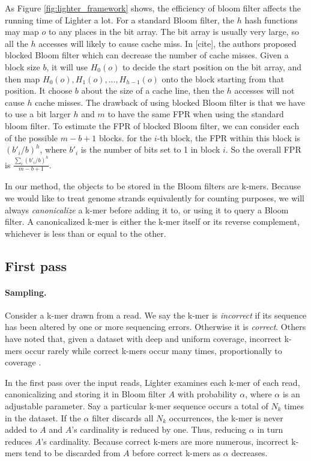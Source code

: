 \documentclass[10pt]{article}
\begin{document}
As Figure \ref{fig:lighter_framework} shows, the efficiency of bloom filter affects the running time of Lighter a lot. For a standard Bloom filter, the $h$ hash functions may map $o$ to any places in the bit array. The bit array is usually very large, so all the $h$ accesses will likely to cause cache miss. In [cite], the authors proposed blocked Bloom filter which can decrease the number of cache misses. Given a block size $b$, it will use $H_0(o)$ to decide the start position on the bit array, and then map $H_0(o), H_1(o),...,H_{h-1}(o)$ onto the block starting from that position. It choose $b$ about the size of a cache line, then the $h$ accesses will not cause $h$ cache misses. The drawback of using blocked Bloom filter is that we have to use a bit larger $h$ and $m$ to have the same FPR when using the standard bloom filter. To estimate the FPR of blocked Bloom filter, we can consider each of the possible $m-b+1$ blocks. for the $i$-th block, the FPR within this block is $(b'_i/b)^h$, where $b'_i$ is the number of bits set to 1 in block $i$. So the overall FPR is $\displaystyle\frac{\sum_i (b'_i/b)^h}{m-b+1}$.

In our method, the objects to be stored in the Bloom filters are k-mers.  Because we would like to treat genome strands equivalently for counting purposes, we will always \emph{canonicalize} a k-mer before adding it to, or using it to query a Bloom filter.  A canonicalized k-mer is either the k-mer itself or its reverse complement, whichever is less than or equal to the other.


\subsection*{First pass}

\paragraph{Sampling.}  Consider a k-mer drawn from a read.  We say the k-mer is \emph{incorrect} if its sequence has been altered by one or more sequencing errors.  Otherwise it is \emph{correct}.  Others have noted that, given a dataset with deep and uniform coverage, incorrect k-mers occur rarely while correct k-mers occur many times, proportionally to coverage \cite{pevzner2001eulerian, chaisson2004fragment}.

In the first pass over the input reads, Lighter examines each k-mer of each read, canonicalizing and storing it in Bloom filter $A$ with probability $\alpha$, where $\alpha$ is an adjustable parameter.  Say a particular k-mer sequence occurs a total of $N_k$ times in the dataset.  If the $\alpha$ filter discards all $N_k$ occurrences, the k-mer is never added to $A$ and $A$'s cardinality is reduced by one.  Thus, reducing $\alpha$ in turn reduces $A$'s cardinality.  Because correct k-mers are more numerous, incorrect k-mers tend to be discarded from $A$ before correct k-mers as $\alpha$ decreases.
\end{document}

